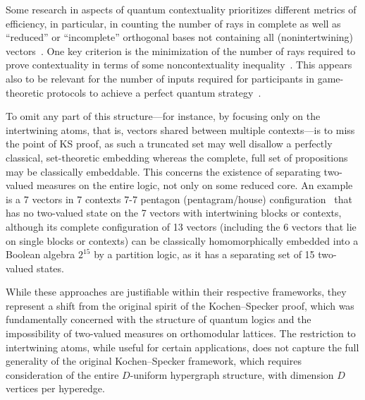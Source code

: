 \documentclass[%
  reprint,
  superscriptaddress,
  showpacs,
  showkeys,
  amsmath,amssymb,
  pra,
  longbibliography,
  floatfix,
  x11names
]{revtex4-2}
\begin{document}
Some research in  aspects of quantum contextuality prioritizes different metrics of efficiency,
in particular, in counting the number of rays in complete as well as ``reduced'' or ``incomplete''
orthogonal bases not containing all (nonintertwining) vectors~\cite[Theorem~1]{2025-cabello-trandafir}.
One key criterion is the minimization of the number of rays required to prove contextuality in terms
of some noncontextuality inequality~\cite{cabello:210401}.
This appears also to be relevant for the number of inputs required for participants in game-theoretic protocols to achieve a perfect quantum strategy~\cite{2024-cabello-trandafir0}.

To omit any part of this structure---for instance, by focusing only on the intertwining atoms, that is, vectors shared between multiple contexts---is
to miss the point of KS proof, as such a truncated set may well disallow a perfectly classical, set-theoretic embedding
whereas the complete, full set of propositions may be classically embeddable.
This concerns the existence of separating two-valued measures on the entire logic, not only on some reduced core.
An example is a 7 vectors in 7 contexts 7-7 pentagon (pentagram/house) configuration~\cite[Fig.~6(a)]{pavicic-2025} that has no two-valued state
on the 7 vectors with intertwining blocks or contexts, although
its complete configuration of 13 vectors (including the 6 vectors that lie on single blocks or contexts) can be classically homomorphically embedded into a Boolean algebra $2^{15}$
by a partition logic, as it has a separating set of 15 two-valued states.

While these approaches are justifiable within their respective frameworks,
they represent a shift from the original spirit of the Kochen--Specker proof,
which was fundamentally concerned with the structure of quantum logics and the impossibility of two-valued measures
on orthomodular lattices.
The restriction to intertwining atoms, while useful for certain applications,
does not capture the full generality of the original Kochen--Specker framework,
which requires consideration of the entire $D$-uniform hypergraph structure, with dimension $D$ vertices per hyperedge.
\end{document}
